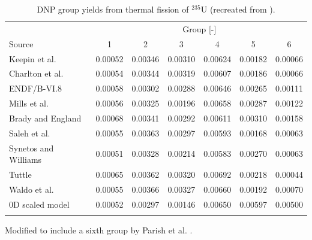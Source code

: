 \begin{table}[!h]
\centering
\begin{threeparttable}
\caption{\gls{DNP} group yields from thermal fission of $^{235}$U (recreated from \cite{parish1999status}).}
\begin{tabular}{lcccccc}
\hline
 & \multicolumn{6}{c}{Group [-]} \\
Source & 1 & 2 & 3 & 4 & 5 & 6 \\
\hline
Keepin et al. \cite{keepin1957delayed}   & 0.00052 & 0.00346 & 0.00310 & 0.00624 & 0.00182 & 0.00066 \\
Charlton et al. \cite{charlton1996delayed}\tnote{*} & 0.00054 & 0.00344 & 0.00319 & 0.00607 & 0.00186 & 0.00066 \\
ENDF/B-VI.8 \cite{endf6}   & 0.00058 & 0.00302 & 0.00288 & 0.00646 & 0.00265 & 0.00111 \\
Mills et al. \cite{mills1991study}    & 0.00056 & 0.00325 & 0.00196 & 0.00658 & 0.00287 & 0.00122 \\
Brady and England \cite{brady1989delayed} & 0.00068 & 0.00341 & 0.00292 & 0.00611 & 0.00310 & 0.00158 \\
Saleh et al. \cite{saleh1997measurements} & 0.00055 & 0.00363 & 0.00297 & 0.00593 & 0.00168 & 0.00063 \\
Synetos and Williams \cite{synetos1983delayed}\tnote{*} & 0.00051 & 0.00328 & 0.00214 & 0.00583 & 0.00270 & 0.00063 \\
Tuttle \cite{tuttle1975delayed}    & 0.00065 & 0.00362 & 0.00320 & 0.00692 & 0.00218 & 0.00044 \\
Waldo et al.\cite{waldo1981delayed}    & 0.00055 & 0.00366 & 0.00327 & 0.00660 & 0.00192 & 0.00070 \\
0D scaled model & 0.00052 & 0.00297 & 0.00146 & 0.00650 & 0.00597 & 0.00500\\
\hline
\label{tab:macro-yields-net}
\end{tabular}
\begin{tablenotes}
\item[*] Modified to include a sixth group by Parish et al. \cite{parish1999status}.
\end{tablenotes}
\end{threeparttable}
\end{table}

